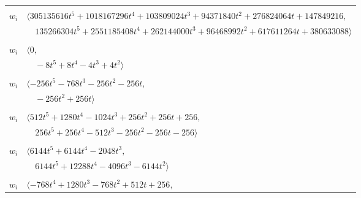 \documentclass[11pt]{article}
\begin{document}
\begin{longtable}{@{}ll@{}}
\addlinespace[2pt]
\multicolumn{2}{@{}p{0.97\textwidth}@{}}{$i=66$, $D_i=524288$, $\rho_{ij}$: $4{:}1, \allowbreak 6{:}1, \allowbreak 13{:}2, \allowbreak 19{:}2, \allowbreak 20{:}2, \allowbreak 24{:}1, \allowbreak 27{:}2, \allowbreak 30{:}2, \allowbreak 36{:}1, \allowbreak 38{:}1, \allowbreak 53{:}2, \allowbreak 67{:}1$}\\
$w_i$ & $\langle 305135616t^{5}+1018167296t^{4}+103809024t^{3}+94371840t^{2}+276824064t+147849216,$\\
 & $\quad 135266304t^{5}+2551185408t^{4}+262144000t^{3}+96468992t^{2}+617611264t+380633088\rangle$\\
\addlinespace[2pt]
\multicolumn{2}{@{}p{0.97\textwidth}@{}}{$i=67$, $D_i=2$, $\rho_{ij}$: $35{:}1, \allowbreak 40{:}1, \allowbreak 54{:}2, \allowbreak 66{:}2$}\\
$w_i$ & $\langle 0,$\\
 & $\quad -8t^{5}+8t^{4}-4t^{3}+4t^{2}\rangle$\\
\addlinespace[2pt]
\multicolumn{2}{@{}p{0.97\textwidth}@{}}{$i=68$, $D_i=256$, $\rho_{ij}$: $29{:}2, \allowbreak 30{:}2, \allowbreak 46{:}1, \allowbreak 48{:}1, \allowbreak 56{:}2$}\\
$w_i$ & $\langle -256t^{5}-768t^{3}-256t^{2}-256t,$\\
 & $\quad -256t^{2}+256t\rangle$\\
\addlinespace[2pt]
\multicolumn{2}{@{}p{0.97\textwidth}@{}}{$i=69$, $D_i=256$, $\rho_{ij}$: $2{:}2, \allowbreak 9{:}1, \allowbreak 11{:}1, \allowbreak 24{:}2, \allowbreak 44{:}1, \allowbreak 75{:}2$}\\
$w_i$ & $\langle 512t^{5}+1280t^{4}-1024t^{3}+256t^{2}+256t+256,$\\
 & $\quad 256t^{5}+256t^{4}-512t^{3}-256t^{2}-256t-256\rangle$\\
\addlinespace[2pt]
\multicolumn{2}{@{}p{0.97\textwidth}@{}}{$i=70$, $D_i=2048$, $\rho_{ij}$: $8{:}2, \allowbreak 10{:}2, \allowbreak 15{:}1, \allowbreak 23{:}1, \allowbreak 48{:}2, \allowbreak 65{:}1, \allowbreak 73{:}1$}\\
$w_i$ & $\langle 6144t^{5}+6144t^{4}-2048t^{3},$\\
 & $\quad 6144t^{5}+12288t^{4}-4096t^{3}-6144t^{2}\rangle$\\
\addlinespace[2pt]
\multicolumn{2}{@{}p{0.97\textwidth}@{}}{$i=71$, $D_i=256$, $\rho_{ij}$: $0{:}1, \allowbreak 10{:}2, \allowbreak 29{:}2, \allowbreak 44{:}1, \allowbreak 46{:}2$}\\
$w_i$ & $\langle -768t^{4}+1280t^{3}-768t^{2}+512t+256,$\\

\end{longtable}
\end{document}
